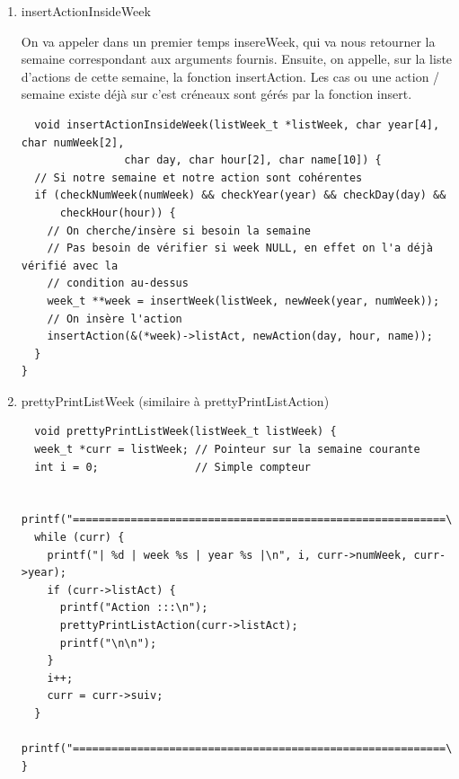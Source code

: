 \documentclass[11pt]{article}
\begin{document}
\begin{enumerate}
\item insertActionInsideWeek
\label{sec:orgaa66f25}

On va appeler dans un premier temps insereWeek, qui va nous retourner la semaine
correspondant aux arguments fournis. Ensuite, on appelle, sur la liste d'actions de cette semaine, la fonction insertAction. Les cas ou une action / semaine existe
déjà sur c'est créneaux sont gérés par la fonction insert.

\begin{lstlisting}
  void insertActionInsideWeek(listWeek_t *listWeek, char year[4], char numWeek[2],
			    char day, char hour[2], char name[10]) {
  // Si notre semaine et notre action sont cohérentes
  if (checkNumWeek(numWeek) && checkYear(year) && checkDay(day) &&
      checkHour(hour)) {
    // On cherche/insère si besoin la semaine
    // Pas besoin de vérifier si week NULL, en effet on l'a déjà vérifié avec la
    // condition au-dessus
    week_t **week = insertWeek(listWeek, newWeek(year, numWeek));
    // On insère l'action
    insertAction(&(*week)->listAct, newAction(day, hour, name));
  }
}
\end{lstlisting}


\item prettyPrintListWeek (similaire à prettyPrintListAction)
\label{sec:org8cbee85}

\begin{lstlisting}
  void prettyPrintListWeek(listWeek_t listWeek) {
  week_t *curr = listWeek; // Pointeur sur la semaine courante
  int i = 0;               // Simple compteur

  printf("==========================================================\n");
  while (curr) {
    printf("| %d | week %s | year %s |\n", i, curr->numWeek, curr->year);
    if (curr->listAct) {
      printf("Action :::\n");
      prettyPrintListAction(curr->listAct);
      printf("\n\n");
    }
    i++;
    curr = curr->suiv;
  }
  printf("==========================================================\n\n");
}
\end{lstlisting}
\end{enumerate}
\end{document}
